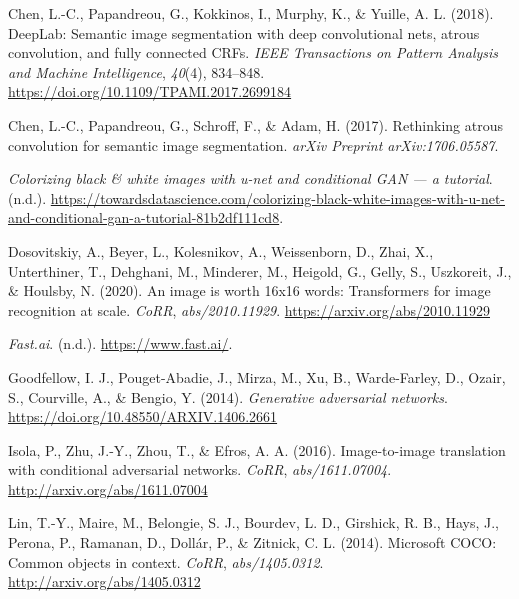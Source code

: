 \documentclass[
]{article}
\newlength{\cslhangindent}
\newlength{\cslentryspacingunit} %
\newenvironment{CSLReferences}[2] %
 {%
  \setlength{\parindent}{0pt}
  \ifodd #1
  \let\oldpar\par
  \def\par{\hangindent=\cslhangindent\oldpar}
  \fi
  \setlength{\parskip}{#2\cslentryspacingunit}
 }%
 {}
\begin{document}
\hypertarget{refs}{}
\begin{CSLReferences}{1}{0}
\leavevmode{}%
Chen, L.-C., Papandreou, G., Kokkinos, I., Murphy, K., \& Yuille, A. L.
(2018). DeepLab: Semantic image segmentation with deep convolutional
nets, atrous convolution, and fully connected CRFs. \emph{IEEE
Transactions on Pattern Analysis and Machine Intelligence},
\emph{40}(4), 834--848. \url{https://doi.org/10.1109/TPAMI.2017.2699184}

\leavevmode{}%
Chen, L.-C., Papandreou, G., Schroff, F., \& Adam, H. (2017). Rethinking
atrous convolution for semantic image segmentation. \emph{arXiv Preprint
arXiv:1706.05587}.

\leavevmode{}%
\emph{Colorizing black \& white images with u-net and conditional GAN
--- a tutorial}. (n.d.).
\url{https://towardsdatascience.com/colorizing-black-white-images-with-u-net-and-conditional-gan-a-tutorial-81b2df111cd8}.

\leavevmode{}%
Dosovitskiy, A., Beyer, L., Kolesnikov, A., Weissenborn, D., Zhai, X.,
Unterthiner, T., Dehghani, M., Minderer, M., Heigold, G., Gelly, S.,
Uszkoreit, J., \& Houlsby, N. (2020). An image is worth 16x16 words:
Transformers for image recognition at scale. \emph{CoRR},
\emph{abs/2010.11929}. \url{https://arxiv.org/abs/2010.11929}

\leavevmode{}%
\emph{Fast.ai}. (n.d.). \url{https://www.fast.ai/}.

\leavevmode{}%
Goodfellow, I. J., Pouget-Abadie, J., Mirza, M., Xu, B., Warde-Farley,
D., Ozair, S., Courville, A., \& Bengio, Y. (2014). \emph{Generative
adversarial networks}. \url{https://doi.org/10.48550/ARXIV.1406.2661}

\leavevmode{}%
Isola, P., Zhu, J.-Y., Zhou, T., \& Efros, A. A. (2016). Image-to-image
translation with conditional adversarial networks. \emph{CoRR},
\emph{abs/1611.07004}. \url{http://arxiv.org/abs/1611.07004}

\leavevmode{}%
Lin, T.-Y., Maire, M., Belongie, S. J., Bourdev, L. D., Girshick, R. B.,
Hays, J., Perona, P., Ramanan, D., Dollár, P., \& Zitnick, C. L. (2014).
Microsoft {COCO:} Common objects in context. \emph{CoRR},
\emph{abs/1405.0312}. \url{http://arxiv.org/abs/1405.0312}


\end{CSLReferences}
\end{document}
